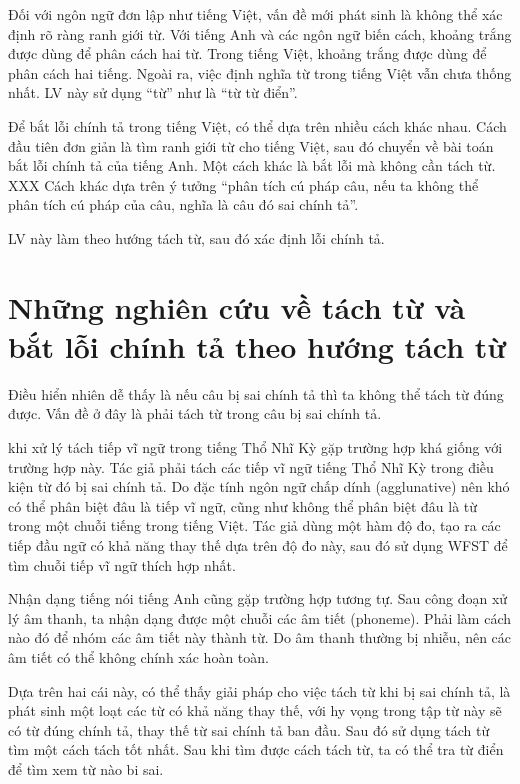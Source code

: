 \documentclass[a4paper]{book}
\begin{document}
Đối với ngôn ngữ đơn lập như tiếng Việt, vấn đề mới phát sinh là không
thể xác định rõ ràng ranh giới từ. Với tiếng Anh và các ngôn ngữ biến
cách, khoảng trắng được dùng để phân cách hai từ. Trong tiếng Việt,
khoảng trắng được dùng để phân cách hai tiếng. Ngoài ra, việc định
nghĩa từ trong tiếng Việt vẫn chưa thống nhất. LV này sử dụng ``từ''
như là ``từ từ điển''.

Để bắt lỗi chính tả trong tiếng Việt, có thể dựa trên nhiều cách khác
nhau. Cách đầu tiên đơn giản là tìm ranh giới từ cho tiếng Việt, sau
đó chuyển về bài toán bắt lỗi chính tả của tiếng Anh. Một cách khác
là bắt lỗi mà không cần tách từ. XXX
Cách khác dựa trên ý tưởng ``phân tích cú pháp câu, nếu ta không thể
phân tích cú pháp của câu, nghĩa là câu đó sai chính tả''.

LV này làm theo hướng tách từ, sau đó xác định lỗi chính tả.

\section{Những nghiên cứu về tách từ và bắt lỗi chính tả theo hướng
tách từ}

Điều hiển nhiên dễ thấy là nếu câu bị sai chính tả thì ta không thể
tách từ đúng được. Vấn đề ở đây là phải tách từ trong câu bị sai chính
tả.

\cite{Oflazer} khi xử lý tách tiếp vĩ ngữ trong tiếng Thổ Nhĩ Kỳ gặp trường
hợp khá giống với trường hợp này. Tác giả phải tách các tiếp vĩ ngữ
tiếng Thổ Nhĩ Kỳ trong điều kiện từ đó bị sai chính tả. Do đặc tính
ngôn ngữ chấp dính (agglunative) nên khó có thể phân biệt đâu là tiếp
vĩ ngữ, cũng như không thể phân biệt đâu là từ trong một chuỗi tiếng
trong tiếng Việt. Tác giả dùng một hàm độ đo, tạo ra các tiếp đầu ngữ
có khả năng thay thế dựa trên độ đo này, sau đó sử dụng WFST để tìm
chuỗi tiếp vĩ ngữ thích hợp nhất.

Nhận dạng tiếng nói tiếng Anh cũng gặp trường hợp tương tự. Sau công
đoạn xử lý âm thanh, ta nhận dạng được một chuỗi các âm tiết
(phoneme). Phải làm cách nào đó để nhóm các âm tiết này thành từ. Do
âm thanh thường bị nhiễu, nên các âm tiết có thể không chính xác hoàn
toàn.

Dựa trên hai cái này, có thể thấy giải pháp cho việc tách từ khi bị
sai chính tả, là phát sinh một loạt các từ có khả năng thay thế, với
hy vọng trong tập từ này sẽ có từ đúng chính tả, thay thế từ sai chính
tả ban đầu. Sau đó sử dụng tách từ tìm một cách tách tốt nhất. Sau khi
tìm được cách tách từ, ta có thể tra từ điển để tìm xem từ nào bi sai.
\end{document}
